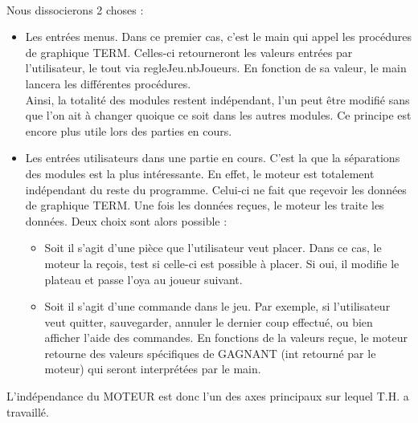 \documentclass{report}
\begin{document}
        \paragraph*{} %
	Nous dissocierons 2 choses : \\
	\begin{itemize} %
		\item Les entrées menus.
		Dans ce premier cas, c'est le main qui appel les procédures de graphique TERM. Celles-ci retourneront les valeurs entrées par l'utilisateur, le tout via regleJeu.nbJoueurs. En fonction de sa valeur, le main lancera les différentes procédures.\\
		Ainsi, la totalité des modules restent indépendant, l'un peut être modifié sans que l'on ait à changer quoique ce soit dans les autres modules. Ce principe est encore plus utile lors des parties en cours. 
		\item Les entrées utilisateurs dans une partie en cours.
		C'est la que la séparations des modules est la plus intéressante. En effet, le moteur est totalement indépendant du reste du programme. Celui-ci ne fait que reçevoir les données de graphique TERM. 
		Une fois les données reçues, le moteur les traite les données. Deux choix sont alors possible : \\
		\begin{itemize} %
			\item Soit il s'agit d'une pièce que l'utilisateur veut placer. Dans ce cas, le moteur la reçois, test si celle-ci est possible à placer. Si oui, il modifie le plateau et passe l'oya au joueur suivant. 
			\item Soit il s'agit d'une commande dans le jeu. Par exemple, si l'utilisateur veut quitter, sauvegarder, annuler le dernier coup effectué, ou bien afficher l'aide des commandes. En fonctions de la valeurs reçue, le moteur retourne des valeurs spécifiques de GAGNANT (int retourné par le moteur) qui seront interprétées par le main.\\
                \end{itemize}
        \end{itemize}
	
	L'indépendance du MOTEUR est donc l'un des axes principaux sur lequel T.H. a travaillé.\\
		
\end{document}
